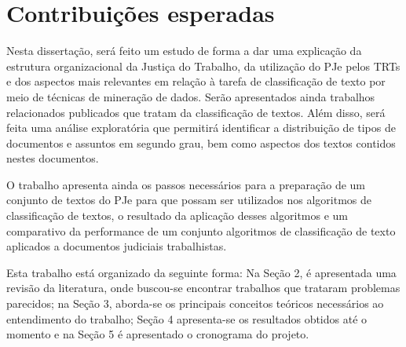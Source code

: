 \section{Contribuições esperadas}
Nesta dissertação, será feito um estudo de forma a dar uma explicação da estrutura organizacional da Justiça do Trabalho, da utilização do PJe pelos TRTs e dos aspectos mais relevantes em relação à tarefa de classificação de texto por meio de técnicas de mineração de dados. Serão apresentados ainda trabalhos relacionados publicados que tratam da classificação de textos. Além disso, será feita uma análise exploratória que permitirá identificar a distribuição de tipos de documentos e assuntos em segundo grau, bem como aspectos dos textos contidos nestes documentos.

O trabalho apresenta ainda os passos necessários para a preparação de um conjunto de textos do PJe para que possam ser utilizados nos algoritmos de classificação de textos, o resultado da aplicação desses algoritmos e um comparativo da performance de um conjunto algoritmos de classificação de texto aplicados a documentos judiciais trabalhistas. 





Esta trabalho está organizado da seguinte forma: Na Seção 2, é apresentada uma revisão da literatura, onde buscou-se encontrar trabalhos que trataram problemas parecidos; na Seção 3, aborda-se os principais conceitos teóricos necessários ao entendimento do trabalho; Seção 4 apresenta-se os resultados obtidos até o momento e na Seção 5 é apresentado o cronograma do projeto.
